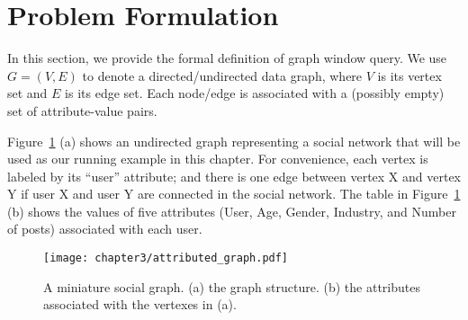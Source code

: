 \section{Problem Formulation}
In this section, we provide the formal definition of graph window query.
We use $G = (V,E)$ to denote a directed/undirected data graph, where $V$ is its vertex set and $E$ is its edge set.
Each node/edge is associated with a (possibly empty) set of attribute-value pairs.


Figure~\ref{fig:attributed} (a) shows an undirected graph representing 
a social network that will be used as our running example in this chapter. 
For convenience, each vertex is labeled by its ``user'' attribute;
and there is one edge between vertex X and vertex Y if user X and user Y are connected in the social network.
The table in Figure~\ref{fig:attributed} (b) shows the values of five attributes (User, Age, Gender, Industry, and Number of posts) associated with each user.


\begin{figure}[h]
\centering
\texttt{[image: chapter3/attributed\_graph.pdf]}
	\caption{A miniature social graph. (a) the graph structure. (b) the attributes associated with the vertexes in (a).} 
	\label{fig:attributed}
\end{figure}

